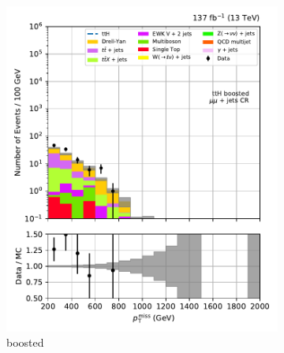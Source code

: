 \begin{figure}[htbp]
    \centering
    \begin{subfigure}[b]{0.24\textwidth}
        \includegraphics[width=\textwidth]{figures/region_plots/full_Run2/region_2/ttH_boosted.pdf}
        \caption{\ttH boosted}
    \end{subfigure}
    \hfill
    \begin{subfigure}[b]{0.24\textwidth}

\end{subfigure}
\end{figure}
